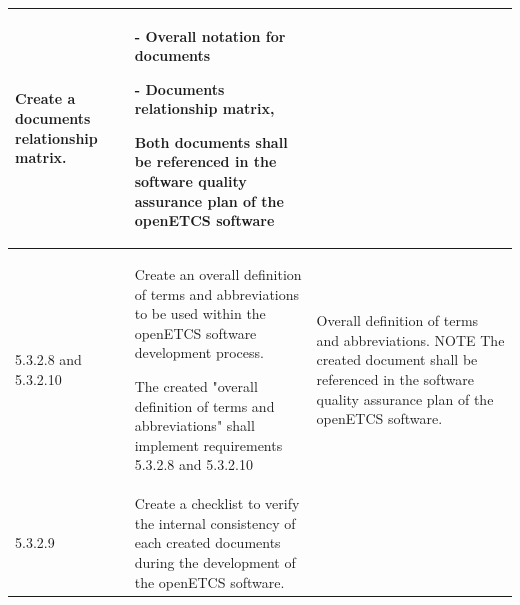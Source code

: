 \documentclass{template/openetcs_report}
\begin{document}
{\begin{longtable}{|p{2cm}|p{9cm}|p{3cm}|}
Create a documents relationship matrix.
& 
- Overall notation for documents

- Documents relationship matrix,

Both documents shall be referenced in the software quality assurance plan of the openETCS software\\ 
\hline
5.3.2.8 and 5.3.2.10 & Create an overall definition of terms and abbreviations to be used within the openETCS software development process. 

The created "overall definition of terms and abbreviations" shall implement requirements 5.3.2.8 and 5.3.2.10
& Overall definition of terms and abbreviations.
\linebreak
\linebreak
NOTE\linebreak
The created document shall be referenced in the software quality assurance plan of the openETCS software.\\ 
\hline
5.3.2.9 & Create a checklist to verify the internal consistency of each created documents during the development of the openETCS software.


\end{longtable}}
\end{document}
